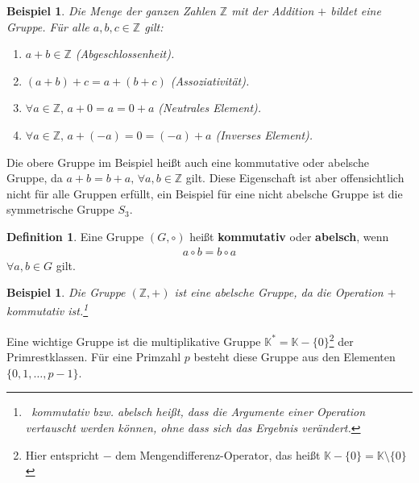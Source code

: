 \documentclass[12pt,oneside]{article}
\newtheorem{example}[theorem]{Beispiel}
\theoremstyle{remark}
\theoremstyle{definition}
\newtheorem{definition}{Definition}[section]
\begin{document}
\begin{example}
Die Menge der ganzen Zahlen $\mathbb{Z}$ mit der Addition $+$ bildet eine Gruppe.
Für alle $a,b,c \in \mathbb{Z}$ gilt:
\begin{enumerate}
    \item $a + b \in \mathbb{Z}$ (Abgeschlossenheit).\newline
    
    \item $(a + b) + c = a + (b + c)$ (Assoziativität).\newline
    
    \item $\forall a \in \mathbb{Z}, \, a + 0 = a = 0 + a$ (Neutrales Element).\newline
    
    \item $\forall a \in \mathbb{Z}, \, a + (-a) = 0 = (-a) + a$ (Inverses Element).
\end{enumerate}
\end{example}

Die obere Gruppe im Beispiel heißt auch eine kommutative oder abelsche Gruppe, da  $a + b = b + a, \, \forall a,b \in \mathbb{Z}$ gilt. Diese Eigenschaft ist aber offensichtlich nicht für alle Gruppen erfüllt, ein Beispiel für eine nicht abelsche Gruppe ist die symmetrische Gruppe $S_3$\cite{s3}.

\begin{definition}
Eine Gruppe $(G,\circ)$ heißt \textbf{kommutativ} oder \textbf{abelsch}, wenn
\begin{align*}
    a \circ b = b \circ a  
\end{align*}
$\forall a,b \in G$ gilt.
\end{definition}

\smallskip

\begin{example}
Die Gruppe $(\mathbb{Z},+)$ ist eine abelsche Gruppe, da die Operation $+$ kommutativ ist.\footnote{$\,$ kommutativ bzw. abelsch heißt, dass die Argumente einer Operation vertauscht werden können, ohne dass sich das Ergebnis verändert.}
\end{example}

\smallskip

Eine wichtige Gruppe ist die multiplikative Gruppe $\mathbb{K}^{*} = \mathbb{K} - \{ 0\}$\footnote{Hier entspricht $-$ dem Mengendifferenz-Operator, das heißt $\mathbb{K} - \{ 0\} = \mathbb{K}\setminus \{ 0\}$ } der Primrestklassen. Für eine Primzahl $p$ besteht diese Gruppe aus den Elementen $\{ 0,1,\dots, p - 1 \}$.
\end{document}
